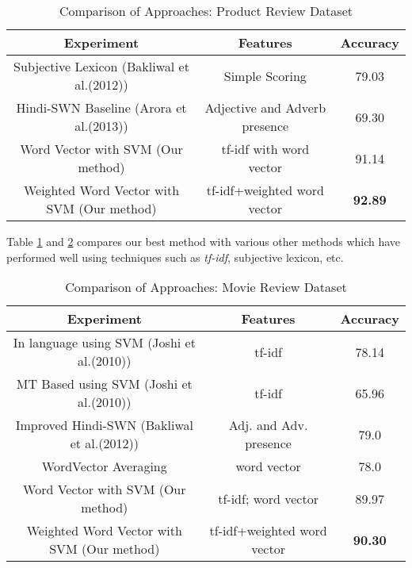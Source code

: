 \begin {table}[h!]
\centering
\begin{tabular}{ | c | c | c | }
\hline
\textbf{Experiment} & \textbf{Features} & \textbf{Accuracy} \\ \hline
Subjective Lexicon (Bakliwal et al.(2012)) & Simple Scoring & 79.03\\ \hline
Hindi-SWN Baseline (Arora et al.(2013)) & Adjective and Adverb presence & 69.30\\ \hline
Word Vector with SVM (Our method) & tf-idf with word vector & 91.14\\ \hline
Weighted Word Vector with SVM (Our method) & tf-idf+weighted word vector & \textbf{92.89}\\ \hline
\end{tabular}
\caption {Comparison of Approaches: Product Review Dataset}
\label{table:hindi_product}
\end{table}
Table \ref{table:hindi_product} and \ref{table:hindi_movie} compares our best method with various other methods which have performed well using techniques such as \emph{tf-idf}, subjective lexicon, etc.

\begin {table}[h!]
\centering
\begin{tabular}{ | c | c | c | }
\hline
\textbf{Experiment} & \textbf{Features} & \textbf{Accuracy} \\ \hline
In language using SVM (Joshi et al.(2010)) & tf-idf & 78.14\\ \hline
MT Based using SVM (Joshi et al.(2010)) & tf-idf & 65.96\\ \hline
Improved Hindi-SWN  (Bakliwal et al.(2012)) & Adj. and Adv. presence & 79.0\\ \hline
WordVector Averaging & word vector & 78.0\\ \hline
Word Vector with SVM (Our method) & tf-idf; word vector & 89.97\\ \hline
Weighted Word Vector with SVM (Our method) & tf-idf+weighted word vector & \textbf{90.30}\\ \hline
\end{tabular}
\caption {Comparison of Approaches: Movie Review Dataset}
\label{table:hindi_movie}
\end{table}

